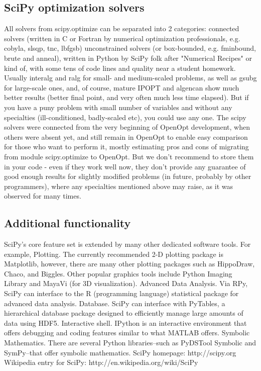 
\subsection{SciPy optimization solvers}
All solvers from scipy.optimize can be separated into 2 categories:
connected solvers (written in C or Fortran by numerical optimization professionals, e.g. cobyla, slsqp, tnc, lbfgsb)
unconstrained solvers (or box-bounded, e.g. fminbound, brute and anneal), written in Python by SciPy folk after "Numerical Recipes" or kind of, with some tens of code lines and quality near a student homework.
Usually interalg and ralg for small- and medium-scaled problems, as well as gsubg for large-scale ones, and, of course, mature IPOPT and algencan show much better results (better final point, and very often much less time elapsed). But if you have a puny problem with small number of variables and without any specialties (ill-conditioned, badly-scaled etc), you could use any one. The scipy solvers were connected from the very beginning of OpenOpt development, when others were absent yet, and still remain in OpenOpt to enable easy comparison for those who want to perform it, mostly estimating pros and cons of migrating from module scipy.optimize to OpenOpt. But we don't recommend to store them in your code - even if they work well now, they don't provide any guarantee of good enough results for slightly modified problems (in future, probably by other programmers), where any specialties mentioned above may raise, as it was observed for many times.
\subsection{Additional functionality}
SciPy's core feature set is extended by many other dedicated software tools. For example,
Plotting. The currently recommended 2-D plotting package is Matplotlib, however, there are many other plotting packages such as HippoDraw, Chaco, and Biggles. Other popular graphics tools include Python Imaging Library and MayaVi (for 3D visualization).
Advanced Data Analysis. Via RPy, SciPy can interface to the R (programming language) statistical package for advanced data analysis.
Database. SciPy can interface with PyTables, a hierarchical database package designed to efficiently manage large amounts of data using HDF5.
Interactive shell. IPython is an interactive environment that offers debugging and coding features similar to what MATLAB offers.
Symbolic Mathematics. There are several Python libraries--such as PyDSTool Symbolic and SymPy--that offer symbolic mathematics.
SciPy homepage: http://scipy.org
Wikipedia entry for SciPy: http://en.wikipedia.org/wiki/SciPy
